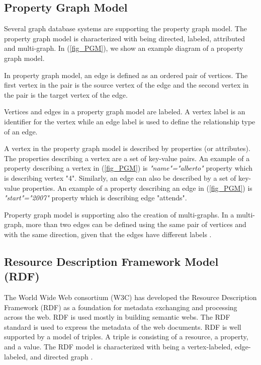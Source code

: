 {\subsection{Property Graph Model}
\label{subsec:PGM}

Several graph database systems are supporting the property graph model. The property graph model is characterized with being directed, labeled, attributed and multi-graph. In (\ref{fig_PGM}), we show an example diagram of a property graph model. 

In property graph model, an edge is defined as an ordered pair of vertices. The first vertex in the pair is the source vertex of the edge and the second vertex in the pair is the target vertex of the edge. 

Vertices and edges in a property graph model are labeled. A vertex label is an identifier for the vertex while an edge label is used to define the relationship type of an edge. 

A vertex in the property graph model is described by properties (or attributes). The properties describing a vertex are a set of key-value pairs. An example of a property describing a vertex in (\ref{fig_PGM}) is \textit{"name"="alberto"} property which is describing vertex "4". Similarly, an edge can also be described by a set of key-value properties. An example of a property describing an edge in (\ref{fig_PGM}) is \textit{"start"="2007"} property which is describing edge "attends".

Property graph model is supporting also the creation of multi-graphs. In a multi-graph, more than two edges can be defined using the same pair of vertices and with the same direction, given that the edges have different labels \cite{DBLP:journals/corr/abs-1006-2361, Robinson:2015:GDN:2846367}.



\subsection{Resource Description Framework Model (RDF)}
\label{subsec:RDF}

The World Wide Web consortium (W3C) has developed the Resource Description Framework (RDF) as a foundation for metadata exchanging and processing across the web. RDF is used mostly in building semantic webs. The RDF standard is used to express the metadata of the web documents. RDF is well supported by a model of triples. A triple is consisting of a resource, a property, and a value. The RDF model is characterized with being a vertex-labeled, edge-labeled, and directed graph \cite{ngomo2014introduction}.

}
